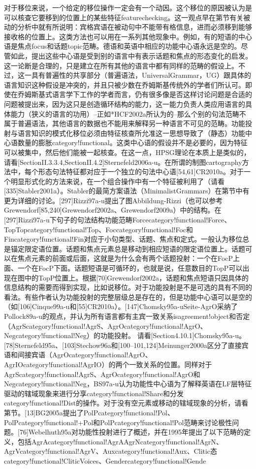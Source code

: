 对于移位来说，一个给定的移位操作一定会有一个动因。这个移位的原因被认为是可以核查它要移到的位置上的某些特征featurechecking。这一观点早在第节有关被动的分析中就有所说明：宾格宾语在被动句中不能带有格信息，进而必须移到能够接收格的位置上。这类方法也可以用在一系列其他现象中。例如，有的短语的中心语是焦点focus和话题topic范畴。德语和英语中相应的功能中心语永远是空的。尽管如此，提出这些中心语是受到别的语言中有表示话题和焦点的形态变化的启发。这一论断是合理的，只是建立在所有其他的语言中都有同样的范畴的假设上。不过，这一具有普遍性的共享部分（普遍语法，UniversalGrammar，UG）跟具体的语言知识这种假设是冲突的，并且只被少数在乔姆斯基传统外的学者们所认可。即使在乔姆斯基式语言学下工作的学者而言，仍有很多像是否这样讨论问题是合适的问题被提出来，因为这只是创造循环结构的能力，这一能力负责人类应用语言的具体能力（狭义的语言的功用）--正如*HCF2002a所认为的--那么个别的句法范畴不属于普遍语法，其他语言的数据也不能用来解释另一种语言不可见的范畴。功能投射与语言知识的模式化移位必须由特征核查所允准这一思想导致了（静态）功能中心语数量的膨胀category!functional。这类中心语的假设并不是必要的，因为特征可以被集中，然后他们能被一起核查。在这一点，HPSG理论在本质上是类似的，请看[SectionII.3.3.4,SectionII.4.2]Sternefeld2006a-u。在所谓的制图cartography方法中，每个形态句法特征都对应于一个独立的句法中心语[54,61]CR2010a。对于一个明显形式化的方法来说，在一个组合操作中有一个特征被利用了（请看[335]Stabler2001a）。Stabler的最简方案语法（MinimalistGrammars）在第节中有更为详细的讨论。[297]Rizzi97a-u提出了图Abbildung-Rizzi（也可以参考Grewendorf[85,240]Grewendorf2002a、Grewendorf2009a）中的结构。在[297]Rizzi97a-u下句子的句法结构功能范畴Forcecategory!functional!Force、TopTopcategory!functional!Top、Foccategory!functional!Foc和Fincategory!functional!Fin对应于小句类型、话题、焦点和定式。一般认为移位总是锚定限定语位置。话题和焦点元素总是移动到相应短语的限定语位置上。话题可以在焦点元素的前面或后面，这就是为什么会有两个话题投射：一个在FocP上面、一个在FocP下面。话题短语是可循环的，也就是说，任意数目的TopP可以出现在图中的TopP位置上。根据[70]Grewendorf2002a，话题和焦点短语只因具体的信息结构的需要而得到实现，比如说移位。对于功能投射是不是可选的具有不同的看法。有些作者认为功能投射的完整层级总是存在的，但是功能中心语可以是空的（如[106]Cinque99a-u和[55]CR2010a）。[147]Chomsky95a-uSeite-AgrO采纳了Pollock89a-u的观点，并认为所有语言都有主宾一致关系isagreement!object和否定（AgrScategory!functional!AgrS、AgrOcategory!functional!AgrO、Negcategory!functional!Neg）的功能投射。	请看[Section4.10.1]Chomsky95a-u。[78]Sternefeld95a、[103]Stechow96a和[100--101,124]Meinunger2000a区分了直接宾语和间接宾语（AgrOcategory!functional!AgrO、AgrIOcategory!functional!AgrIO）的两个一致关系的位置。同样对于AgrScategory!functional!AgrS、AgrOcategory!functional!AgrO和Negcategory!functional!Neg，BS97a-u认为功能性中心语为了解释英语在LF层特征驱动的辖域现象来进行分享category!functional!Share和分发category!functional!Dist的操作。对于没有空元素或移动的辖域现象的分析，请看第节。[13]BG2005a提出了PolPcategory!functional!Pol、PolPcategory!functional!+Pol和PolPcategory!functional!Pol范畴来讨论极性问题。[76]Webelhuth95a对功能性投射进行了概述，并在1995年提出了以下范畴的定义，包括AgrAcategory!functional!AgrAAgrNcategory!functional!AgrN、AgrVcategory!functional!AgrV、Auxcategory!functional!Aux、Clitic态category!functional!CliticVoices、Gendercategory!functional!Gende